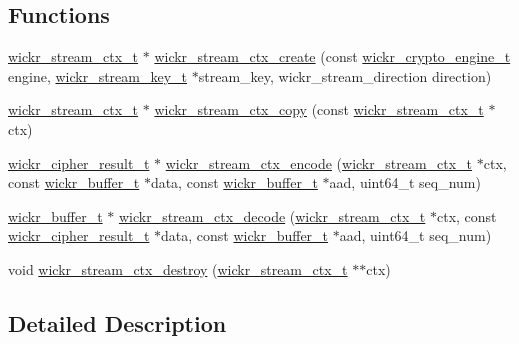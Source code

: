 \subsection*{Functions}
\begin{DoxyCompactItemize}
\item 
\hyperlink{structwickr__stream__ctx}{wickr\+\_\+stream\+\_\+ctx\+\_\+t} $\ast$ \hyperlink{group__wickr__stream_ga0b5c513a3e0958dc7fd4f8455206e32e}{wickr\+\_\+stream\+\_\+ctx\+\_\+create} (const \hyperlink{structwickr__crypto__engine}{wickr\+\_\+crypto\+\_\+engine\+\_\+t} engine, \hyperlink{structwickr__stream__key}{wickr\+\_\+stream\+\_\+key\+\_\+t} $\ast$stream\+\_\+key, wickr\+\_\+stream\+\_\+direction direction)
\item 
\hyperlink{structwickr__stream__ctx}{wickr\+\_\+stream\+\_\+ctx\+\_\+t} $\ast$ \hyperlink{group__wickr__stream_ga707b685e35eb437c33f5ec32c6760005}{wickr\+\_\+stream\+\_\+ctx\+\_\+copy} (const \hyperlink{structwickr__stream__ctx}{wickr\+\_\+stream\+\_\+ctx\+\_\+t} $\ast$ctx)
\item 
\hyperlink{structwickr__cipher__result}{wickr\+\_\+cipher\+\_\+result\+\_\+t} $\ast$ \hyperlink{group__wickr__stream_ga621a3ec801ab996b4fab1fe905c450bd}{wickr\+\_\+stream\+\_\+ctx\+\_\+encode} (\hyperlink{structwickr__stream__ctx}{wickr\+\_\+stream\+\_\+ctx\+\_\+t} $\ast$ctx, const \hyperlink{structwickr__buffer}{wickr\+\_\+buffer\+\_\+t} $\ast$data, const \hyperlink{structwickr__buffer}{wickr\+\_\+buffer\+\_\+t} $\ast$aad, uint64\+\_\+t seq\+\_\+num)
\item 
\hyperlink{structwickr__buffer}{wickr\+\_\+buffer\+\_\+t} $\ast$ \hyperlink{group__wickr__stream_gaa1eb323694f2c1652b51127b0b89138c}{wickr\+\_\+stream\+\_\+ctx\+\_\+decode} (\hyperlink{structwickr__stream__ctx}{wickr\+\_\+stream\+\_\+ctx\+\_\+t} $\ast$ctx, const \hyperlink{structwickr__cipher__result}{wickr\+\_\+cipher\+\_\+result\+\_\+t} $\ast$data, const \hyperlink{structwickr__buffer}{wickr\+\_\+buffer\+\_\+t} $\ast$aad, uint64\+\_\+t seq\+\_\+num)
\item 
void \hyperlink{group__wickr__stream_ga05260bfce1f50352cad32e0354c28a1d}{wickr\+\_\+stream\+\_\+ctx\+\_\+destroy} (\hyperlink{structwickr__stream__ctx}{wickr\+\_\+stream\+\_\+ctx\+\_\+t} $\ast$$\ast$ctx)
\end{DoxyCompactItemize}


\subsection{Detailed Description}


